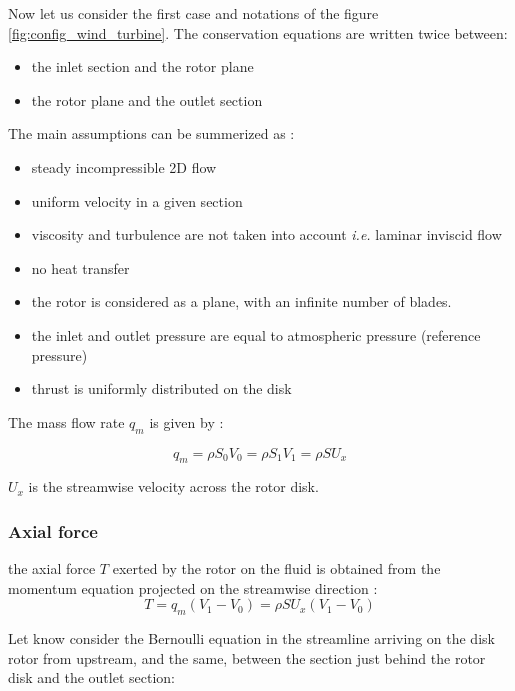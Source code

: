 Now let us consider the first case  and notations of the figure  \ref{fig:config_wind_turbine}.
The conservation equations  are written twice between:

  \begin{itemize}
    \item the inlet section and the rotor plane
    \item the rotor plane and the outlet section 
  \end{itemize}


The main assumptions can be summerized as :

\begin{itemize}
\item steady incompressible 2D flow 
\item uniform velocity in a given section
\item viscosity and turbulence are not taken into account \textit{i.e.} laminar inviscid flow
\item no heat transfer 
\item the rotor is considered as a plane, with an infinite number of blades.
\item the inlet and outlet pressure are equal to atmospheric pressure (reference pressure)
\item thrust is uniformly distributed on the disk
\end{itemize}


The mass flow rate $q_m$ is given by :

\begin{equation}
  q_m = \rho S_0 V_0 = \rho S_1 V_1 = \rho S U_x
  \label{eq:qm}
\end{equation}

$U_x$ is the streamwise velocity across the rotor disk.

\subsubsection{\sc Axial force}
\label{sec:axial_force}

the axial force $T$ exerted by the rotor on the fluid is obtained from
the momentum equation projected on the streamwise direction : 
\begin{equation}
T = q_m (V_1 - V_0) =  \rho S U_x (V_1 - V_0) 
\label{eq:momentum_x}
\end{equation}


Let know consider the Bernoulli equation in the streamline arriving on the disk rotor from upstream,
and the same,  between the section just behind the rotor disk and the outlet section:

